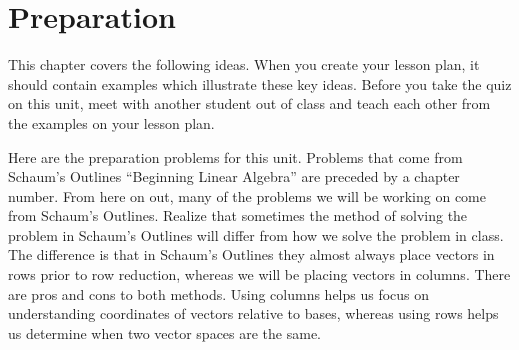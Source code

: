 \section{Preparation}

\noindent
This chapter covers the following ideas. When you create your lesson plan, it should contain examples which illustrate these key ideas. Before you take the quiz on this unit, meet with another student out of class and teach each other from the examples on your lesson plan. 



Here are the preparation problems for this unit.  Problems that come from Schaum's Outlines ``Beginning Linear Algebra'' are preceded by a chapter number. From here on out, many of the problems we will be working on come from Schaum's Outlines.  Realize that sometimes the method of solving the problem in Schaum's Outlines will differ from how we solve the problem in class. The difference is that in Schaum's Outlines they almost always place vectors in rows prior to row reduction, whereas we will be placing vectors in columns. There are pros and cons to both methods. Using columns helps us focus on understanding coordinates of vectors relative to bases, whereas using rows helps us determine when two vector spaces are the same.


















